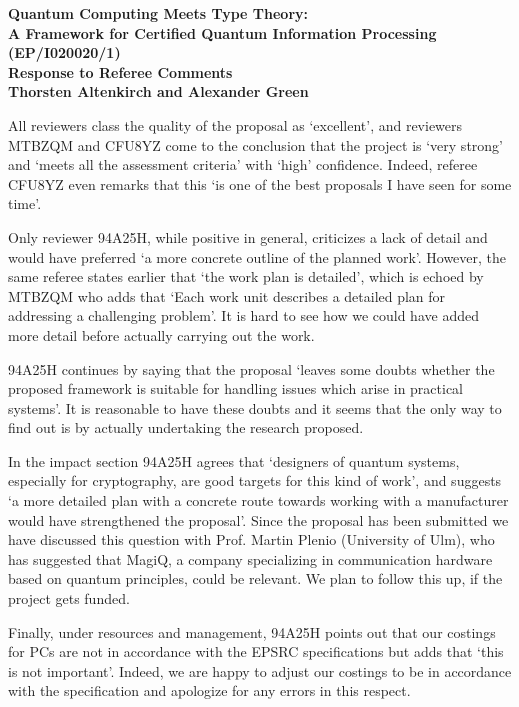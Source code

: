 \documentclass[12pt]{article}
\begin{document}
\thispagestyle{empty}

\begin{center}
  \large\bf
  Quantum Computing Meets Type Theory:\\ A Framework for Certified Quantum Information Processing (EP/I020020/1)\\
  Response to Referee Comments\\[5pt]Thorsten Altenkirch and Alexander Green\\
\end{center}

\noindent 
All reviewers class the quality of the proposal as `excellent', and
reviewers MTBZQM and CFU8YZ come to the conclusion that the project is
`very strong' and `meets all the assessment criteria' with `high'
confidence. Indeed, referee CFU8YZ even remarks that this `is one of
the best proposals I have seen for some time'.

Only reviewer 94A25H, while positive in general, criticizes a lack
of detail and would have preferred `a more concrete outline of the
planned work'. However, the same referee states earlier that `the
work plan is detailed', which is echoed by MTBZQM who adds that
`Each work unit describes a detailed plan for addressing a
challenging problem'. It is hard to see how we could have added more
detail before actually carrying out the work.

94A25H continues by saying that the proposal `leaves
some doubts whether the proposed framework is suitable for handling
issues which arise in practical systems'. It is reasonable to have
these doubts and it seems that the only way to find out is by actually
undertaking the research proposed.


In the impact section 94A25H agrees that `designers of quantum
systems, especially for cryptography, are good targets for this kind
of work', and suggests `a more detailed plan with a concrete route
towards working with a manufacturer would have strengthened the
proposal'.  Since the proposal has been submitted we have discussed
this question with Prof. Martin Plenio (University of Ulm), who has
suggested that MagiQ, a company specializing in communication hardware
based on quantum principles, could be relevant. We plan to follow this
up, if the project gets funded.

Finally, under resources and management, 94A25H points out that our
costings for PCs are not in accordance with the EPSRC specifications
but adds that `this is not important'. Indeed, we are happy to adjust
our costings to be in accordance with the specification and apologize
for any errors in this respect.
\end{document}
